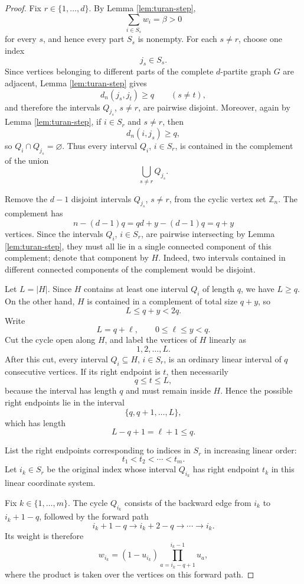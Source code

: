 \documentclass[11pt]{article}
\numberwithin{equation}{section}
\newcommand{\Zn}{\mathbb Z_n}
\begin{document}
\begin{proof}
Fix $r\in\{1,\ldots,d\}$. By Lemma \ref{lem:turan-step},
\[
        \sum_{i\in S_s} w_i=\beta>0
\]
for every $s$, and hence every part $S_s$ is nonempty. For each $s\ne r$,
choose one index
\[
        j_s\in S_s.
\]
Since vertices belonging to different parts of the complete $d$-partite graph
$G$ are adjacent, Lemma \ref{lem:turan-step} gives
\[
        d_n(j_s,j_t)\ge q\qquad (s\ne t),
\]
and therefore the intervals $Q_{j_s}$, $s\ne r$, are pairwise disjoint.
Moreover, again by Lemma \ref{lem:turan-step}, if $i\in S_r$ and $s\ne r$,
then
\[
        d_n(i,j_s)\ge q,
\]
so $Q_i\cap Q_{j_s}=\varnothing$. Thus every interval $Q_i$, $i\in S_r$, is
contained in the complement of the union
\[
        \bigcup_{s\ne r} Q_{j_s}.
\]

Remove the $d-1$ disjoint intervals $Q_{j_s}$, $s\ne r$, from the cyclic
vertex set $\Zn$. The complement has
\[
        n-(d-1)q=qd+y-(d-1)q=q+y
\]
vertices. Since the intervals $Q_i$, $i\in S_r$, are pairwise intersecting by
Lemma \ref{lem:turan-step}, they must all lie in a single connected component
of this complement; denote that component by $H$. Indeed, two intervals
contained in different connected components of the complement would be
disjoint.

Let $L=|H|$. Since $H$ contains at least one interval $Q_i$ of length $q$, we
have $L\ge q$. On the other hand, $H$ is contained in a complement of total
size $q+y$, so
\[
        L\le q+y<2q.
\]
Write
\[
        L=q+\ell,\qquad 0\le \ell\le y<q.
\]
Cut the cycle open along $H$, and label the vertices of $H$ linearly as
\[
        1,2,\ldots,L.
\]
After this cut, every interval $Q_i\subseteq H$, $i\in S_r$, is an ordinary
linear interval of $q$ consecutive vertices. If its right endpoint is $t$,
then necessarily
\[
        q\le t\le L,
\]
because the interval has length $q$ and must remain inside $H$. Hence the
possible right endpoints lie in the interval
\[
        \{q,q+1,\ldots,L\},
\]
which has length
\[
        L-q+1=\ell+1\le q.
\]

List the right endpoints corresponding to indices in $S_r$ in increasing
linear order:
\[
        t_1<t_2<\cdots<t_m.
\]
Let $i_k\in S_r$ be the original index whose interval $Q_{i_k}$ has right
endpoint $t_k$ in this linear coordinate system.

Fix $k\in\{1,\ldots,m\}$. The cycle $Q_{i_k}$ consists of the backward edge
from $i_k$ to $i_k+1-q$, followed by the forward path
\[
        i_k+1-q\to i_k+2-q\to\cdots\to i_k.
\]
Its weight is therefore
\[
        w_{i_k}=(1-u_{i_k})
        \prod_{a=i_k-q+1}^{i_k-1}u_a,
\]
where the product is taken over the vertices on this forward path.


\end{proof}
\end{document}
